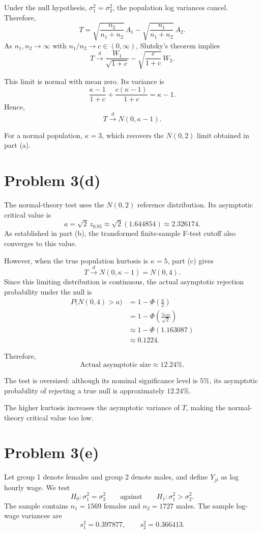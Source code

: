 \documentclass[11pt]{article}
\begin{document}
Under the null hypothesis,
$\sigma_1^2=\sigma_2^2$, the population log
variances cancel. Therefore,
\[
T=
\sqrt{\frac{n_2}{n_1+n_2}}\,A_1
-
\sqrt{\frac{n_1}{n_1+n_2}}\,A_2.
\]
As $n_1,n_2\to\infty$ with
$n_1/n_2\to c\in(0,\infty)$, Slutsky's theorem
implies
\[
T\xrightarrow{d}
\frac{W_1}{\sqrt{1+c}}
-\sqrt{\frac{c}{1+c}}\,W_2.
\]

This limit is normal with mean zero.
Its variance is
\[
\frac{\kappa-1}{1+c}
+\frac{c(\kappa-1)}{1+c}
=\kappa-1.
\]
Hence,
\[
\boxed{T\xrightarrow{d}N(0,\kappa-1).}
\]

For a normal population, $\kappa=3$, which
recovers the $N(0,2)$ limit obtained in part (a).
\section*{Problem 3(d)}

The normal-theory test uses the $N(0,2)$
reference distribution. Its asymptotic
critical value is
\[
a=\sqrt{2}\,z_{0.95}
\approx\sqrt{2}(1.644854)
\approx2.326174.
\]
As established in part (b), the transformed
finite-sample F-test cutoff also converges
to this value.

However, when the true population kurtosis
is $\kappa=5$, part (c) gives
\[
T\xrightarrow{d}N(0,\kappa-1)=N(0,4).
\]
Since this limiting distribution is continuous,
the actual asymptotic rejection probability
under the null is
\[
\begin{aligned}
P\bigl(N(0,4)>a\bigr)
&=1-\Phi\left(\frac{a}{2}\right)\\
&=1-\Phi\left(\frac{z_{0.95}}{\sqrt{2}}\right)\\
&\approx1-\Phi(1.163087)\\
&\approx0.1224.
\end{aligned}
\]

Therefore,
\[
\boxed{
\text{Actual asymptotic size}\approx12.24\%.
}
\]

The test is oversized: although its nominal
significance level is $5\%$, its asymptotic
probability of rejecting a true null is
approximately $12.24\%$.

The higher kurtosis increases the asymptotic
variance of $T$, making the normal-theory
critical value too low.
\section*{Problem 3(e)}

Let group 1 denote females and group 2 denote
males, and define $Y_{ji}$ as log hourly wage.
We test
\[
H_0:\sigma_1^2=\sigma_2^2
\qquad\text{against}\qquad
H_1:\sigma_1^2>\sigma_2^2.
\]
The sample contains $n_1=1569$ females and
$n_2=1727$ males. The sample log-wage variances are
\[
s_1^2=0.397877,
\qquad
s_2^2=0.366413.
\]
\end{document}
